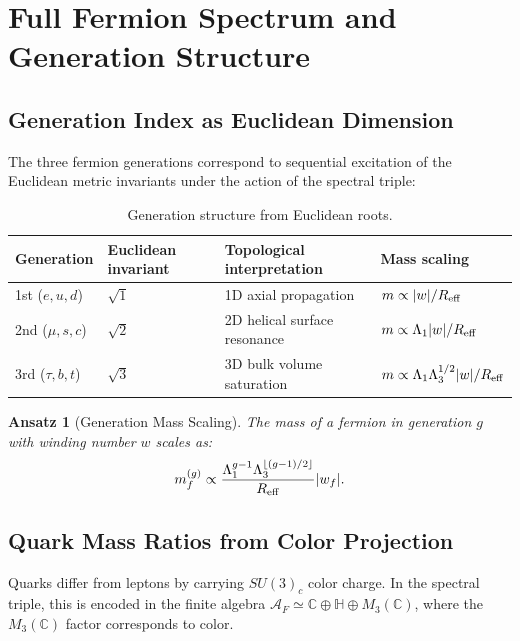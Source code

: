 \documentclass[12pt, a4paper]{article}
\newtheorem{ansatz}[theorem]{Ansatz}
\theoremstyle{definition}
\newcommand{\cA}{\mathcal{A}}
\newcommand{\bbC}{\mathbb{C}}
\newcommand{\bbH}{\mathbb{H}}
\begin{document}
\section{Full Fermion Spectrum and Generation Structure}
\label{sec:spectrum}

\subsection{Generation Index as Euclidean Dimension}
The three fermion generations correspond to sequential excitation of the Euclidean metric invariants under the action of the spectral triple:

\begin{table}[H]
\centering
\caption{Generation structure from Euclidean roots.}
\label{tab:generations}
\begin{tabular}{@{}l l l l@{}}
\toprule
\textbf{Generation} & \textbf{Euclidean invariant} & \textbf{Topological interpretation} & \textbf{Mass scaling} \\
\midrule
1st ($e,u,d$) & $\sqrt{1}$ & 1D axial propagation & $m \propto |w|/R_{\rm eff}$ \\
2nd ($\mu,s,c$) & $\sqrt{2}$ & 2D helical surface resonance & $m \propto \Lambda_1 |w|/R_{\rm eff}$ \\
3rd ($\tau,b,t$) & $\sqrt{3}$ & 3D bulk volume saturation & $m \propto \Lambda_1\Lambda_3^{1/2} |w|/R_{\rm eff}$ \\
\bottomrule
\end{tabular}
\end{table}

\begin{ansatz}[Generation Mass Scaling]
The mass of a fermion in generation $g$ with winding number $w$ scales as:
\begin{equation}
m_f^{(g)} \propto \frac{\Lambda_1^{g-1} \Lambda_3^{\lfloor (g-1)/2 \rfloor}}{R_{\rm eff}} \abs{w_f}.
\label{eq:generation-scaling}
\end{equation}
\end{ansatz}

\subsection{Quark Mass Ratios from Color Projection}
Quarks differ from leptons by carrying $SU(3)_c$ color charge. In the spectral triple, this is encoded in the finite algebra $\cA_F \simeq \bbC \oplus \bbH \oplus M_3(\bbC)$, where the $M_3(\bbC)$ factor corresponds to color.
\end{document}
